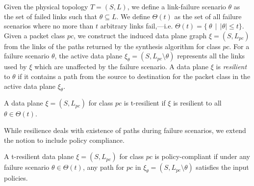 Given the physical topology $T=(S,L)$, we define a link-failure
scenario $\theta$ as the set of failed links such that $\theta \subseteq L$.
	We define $\Theta(t)$ as the set of all failure scenarios where no more than $t$
	arbitrary links fail,---i.e. $\Theta(t) = \{ \ \theta \ \ | \ \ |\theta| \leq t\}$.
Given a packet class $pc$,
we construct the induced data plane graph $\xi = (S, L_{pc})$ from the links
of the paths returned by the synthesis algorithm for class $pc$.
 For a failure scenario
$\theta$, the active data plane $\xi_\theta = (S, L_{pc} \setminus \theta)$ represents
all the links used by $\xi$ which are unaffected by the failure scenario. A data
plane $\xi$ is {\em resilient} to $\theta$ if it contains a path from the source to 
destination for the packet class in the active data plane $\xi_\theta$.
\begin{mydef}[Resilience]
	A data plane $\xi = (S, L_{pc})$ for class $pc$ is t-resilient if $\xi$ is 
	resilient to all $\theta \in \Theta(t)$.
\end{mydef}
While resilience deals with 
existence of paths during failure scenarios,
we extend the notion to include policy compliance.
\begin{mydef}
	A t-resilient data plane $\xi = (S, L_{pc})$ for class $pc$ is policy-compliant if under
	any failure scenario $\theta \in \Theta(t)$, any path for $pc$ in 
	$\xi_\theta=(S, L_{pc} \setminus \theta)$ satisfies the input policies. 
\end{mydef}

